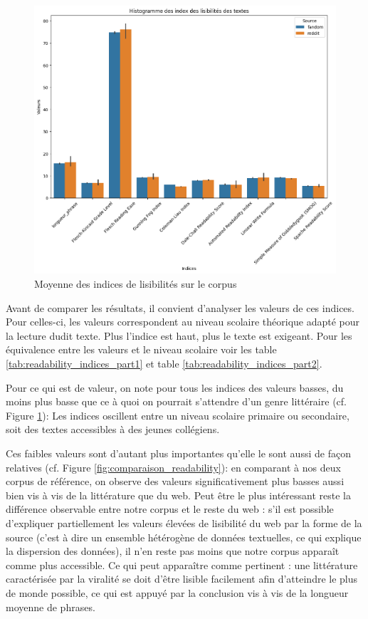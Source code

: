 \documentclass[12pt,a4paper,oneside,titlepage]{book} %
\begin{document}
	\begin{figure}
\centering
\includegraphics[scale=0.45]{illustration/comparaison_lisibilite_source.png}
\caption{Moyenne des indices de lisibilités sur le corpus}
\label{fig:mean_readbility}
	\end{figure}
	
	Avant de comparer les résultats, il convient d'analyser les valeurs de ces indices. Pour celles-ci, les valeurs correspondent au niveau scolaire théorique adapté pour la lecture dudit texte. Plus l'indice est haut, plus le texte est exigeant. Pour les équivalence entre les valeurs et le niveau scolaire voir les table \ref{tab:readability_indices_part1} et table \ref{tab:readability_indices_part2}.
	

	Pour ce qui est de valeur, on note pour tous les indices des valeurs basses, du moins plus basse que ce à quoi on pourrait s'attendre d'un genre littéraire (cf. Figure \ref{fig:mean_readbility}): Les indices oscillent entre un niveau scolaire primaire ou secondaire, soit des textes accessibles à des jeunes collégiens. 
	
	
	Ces faibles valeurs sont d'autant plus importantes qu'elle le sont aussi de façon relatives (cf. Figure \ref{fig:comparaison_readability}): en comparant à nos deux corpus de référence, on observe des valeurs significativement plus basses aussi bien vis à vis de la littérature que du web. 
	Peut être le plus intéressant reste la différence observable entre notre corpus et le reste du web : s'il est possible d'expliquer partiellement les valeurs élevées de lisibilité du web par la forme de la source (c'est à dire un ensemble hétérogène de données textuelles, ce qui explique la dispersion des données), il n'en reste pas moins que notre corpus apparaît comme plus accessible. Ce qui peut  apparaître comme pertinent : une littérature caractérisée par la viralité se doit d'être lisible facilement afin d'atteindre le plus de monde possible, ce qui est appuyé par la conclusion vis à vis de la longueur moyenne de phrases.
	
\end{document}
